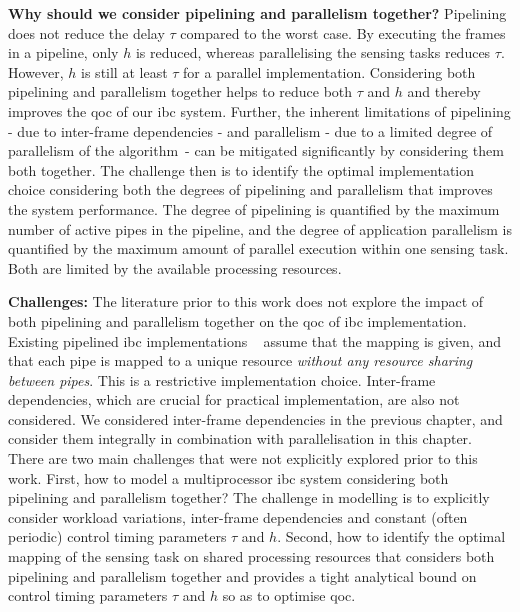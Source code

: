 \noindent\textbf{Why should we consider pipelining and parallelism together?}
Pipelining does not reduce the delay $\tau$ compared to the worst case. By executing the frames in a pipeline, only $h$ is reduced, whereas parallelising the sensing tasks reduces $\tau$. 
However, $h$ is still at least $\tau$ for a parallel implementation. 
Considering both pipelining and parallelism together helps to reduce both $\tau$ and $h$ and thereby improves the \gls{qoc} of our \gls{ibc} system.
Further, the inherent limitations of pipelining - due to inter-frame dependencies - and parallelism - due to a limited degree of parallelism of the algorithm~- can be mitigated significantly by considering them both together.
The challenge then is to identify the optimal implementation choice considering both the degrees of pipelining and parallelism that improves the system performance.
The degree of pipelining is quantified by the maximum number of active pipes in the pipeline, and the degree of application parallelism is quantified by the maximum amount of parallel execution within one sensing task.
Both are limited by the available processing resources.
\vspace{1mm}

\noindent\textbf{Challenges:}
The literature prior to this work does not explore the impact of both pipelining and parallelism together on the \gls{qoc} of \gls{ibc} implementation.
Existing pipelined \gls{ibc} implementations ~\cite{krautgartner1998performance,medina2019designing} assume that the mapping is given, and that each pipe is mapped to a unique resource \textit{without any resource sharing between pipes}. This is a restrictive implementation choice. Inter-frame dependencies, which are crucial for practical implementation, are also not considered. We considered inter-frame dependencies in the previous chapter, and consider them integrally in combination with parallelisation in this chapter.
There are two main challenges that were not explicitly explored prior to this work.
First, how to model a multiprocessor \gls{ibc} system considering both pipelining and parallelism together? 
The challenge in modelling is to explicitly consider workload variations, inter-frame dependencies and constant (often periodic) control timing parameters $\tau$ and $h$.
Second, how to identify the optimal mapping of the sensing task on shared processing resources that considers both pipelining and parallelism together and provides a tight analytical bound on control timing parameters $\tau$ and $h$ so as to optimise \gls{qoc}.

